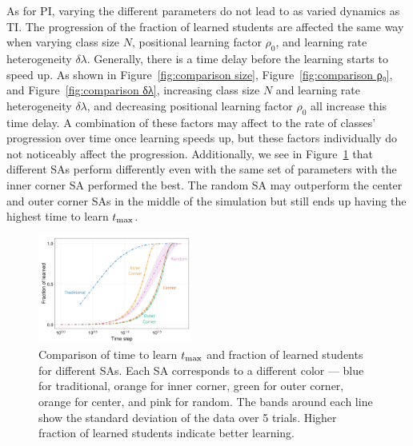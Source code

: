 \documentclass[twocolumn,secnumarabic,amssymb, nobibnotes, aps, prd]{revtex4-2}
\begin{document}
    As for PI, varying the different parameters do not lead to as varied dynamics as TI.
    The progression of the fraction of learned students are affected the same way when varying class size $N$, positional learning factor $\rho_0$, and learning rate heterogeneity $\delta\lambda$.
    Generally, there is a time delay before the learning starts to speed up.
    As shown in Figure~\ref{fig:comparison size}, Figure~\ref{fig:comparison ρ₀}, and Figure~\ref{fig:comparison δλ}, increasing class size $N$ and learning rate heterogeneity $\delta\lambda$, and decreasing positional learning factor $\rho_0$ all increase this time delay.
    A combination of these factors may affect to the rate of classes' progression over time once learning speeds up, but these factors individually do not noticeably affect the progression.
    Additionally, we see in Figure~\ref{fig:comparison SA} that different SAs perform differently even with the same set of parameters with the inner corner SA performed the best.
    The random SA may outperform the center and outer corner SAs in the middle of the simulation but still ends up having the highest time to learn $t_{\rm max}$.


    \begin{figure}[htbp!]
        \centering
        \includegraphics[width=0.45\textwidth]{figures/2D-BPCAIH-analysis/comparison plots/SA.png}
        \caption{Comparison of time to learn $t_{\rm max}$ and fraction of learned students for different SAs.
        Each SA corresponds to a different color --- blue for traditional, orange for inner corner, green for outer corner, orange for center, and pink for random.
        The bands around each line show the standard deviation of the data over 5 trials.
        Higher fraction of learned students indicate better learning.}
        \label{fig:comparison SA}
    \end{figure}
\end{document}
